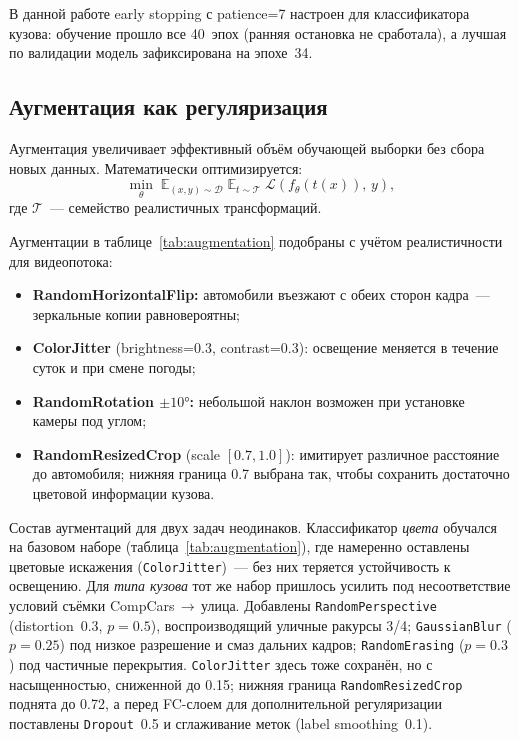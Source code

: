 \documentclass[10pt,a4paper]{report}
\numberwithin{equation}{chapter}
\numberwithin{figure}{chapter}
\numberwithin{table}{chapter}
\begin{document}
В данной работе early stopping с patience=7 настроен
для классификатора кузова: обучение прошло все 40~эпох (ранняя остановка
не сработала), а лучшая по валидации модель зафиксирована на эпохе~34.

\subsection{Аугментация как регуляризация}

Аугментация увеличивает эффективный объём обучающей выборки
без сбора новых данных. Математически оптимизируется:
\begin{equation}
  \min_\theta\;
  \mathbb{E}_{(x,y)\sim\mathcal{D}}\;
  \mathbb{E}_{t\sim\mathcal{T}}\;
  \mathcal{L}(f_\theta(t(x)),\, y),
\end{equation}
где $\mathcal{T}$~--- семейство реалистичных трансформаций.

Аугментации в таблице~\ref{tab:augmentation} подобраны
с учётом реалистичности для видеопотока:
\begin{itemize}[nosep]
  \item \textbf{RandomHorizontalFlip:} автомобили въезжают
    с обеих сторон кадра~--- зеркальные копии равновероятны;
  \item \textbf{ColorJitter} (brightness=0.3, contrast=0.3):
    освещение меняется в течение суток и при смене погоды;
  \item \textbf{RandomRotation $\pm10°$:} небольшой наклон
    возможен при установке камеры под углом;
  \item \textbf{RandomResizedCrop} (scale $[0.7, 1.0]$):
    имитирует различное расстояние до автомобиля;
    нижняя граница 0.7 выбрана так, чтобы сохранить
    достаточно цветовой информации кузова.
\end{itemize}

Состав аугментаций для двух задач неодинаков. Классификатор \emph{цвета}
обучался на базовом наборе (таблица~\ref{tab:augmentation}), где намеренно
оставлены цветовые искажения (\texttt{ColorJitter})~--- без них теряется
устойчивость к освещению. Для \emph{типа кузова} тот же набор пришлось
усилить под несоответствие условий съёмки CompCars\,$\to$\,улица. Добавлены
\texttt{RandomPerspective} (distortion~0.3, $p=0.5$), воспроизводящий
уличные ракурсы 3/4; \texttt{GaussianBlur} ($p=0.25$) под низкое
разрешение и смаз дальних кадров; \texttt{RandomErasing} ($p=0.3$) под
частичные перекрытия. \texttt{ColorJitter} здесь тоже сохранён, но с
насыщенностью, сниженной до 0.15; нижняя граница
\texttt{RandomResizedCrop} поднята до 0.72, а перед FC-слоем для
дополнительной регуляризации поставлены \texttt{Dropout}~0.5 и
сглаживание меток (label smoothing~0.1).
\end{document}
